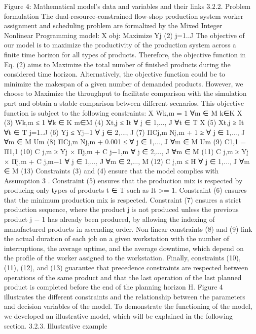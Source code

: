 Figure 4: Mathematical model’s data and variables and their links
3.2.2.	Problem formulation
The dual-resource-constrained flow-shop production system worker assignment and scheduling problem are formalized by the Mixed Integer Nonlinear Programming model:
X
	obj: Maximize	Yj	(2)
j=1..J
The objective of our model is to maximize the productivity of the production system across a finite time horizon for all types of products. Therefore, the objective function in Eq. (2) aims to Maximize the total number of finished products during the considered time horizon. Alternatively, the objective function could be to minimize the makespan of a given number of demanded products. However, we choose to Maximize the throughput to facilitate comparison with the simulation part and obtain a stable comparison between different scenarios.
This objective function is subject to the following constraints:
X	
	Wk,m = 1	∀m ∈ M
k∈K
X	(3)
	Wk,m ≤ 1	∀k ∈ K
m∈M	(4)
	Xt,j ≤ It	∀ j ∈ {1,..., J}	∀t ∈ T
X	(5)
	Xt,j ≥ It	∀t ∈ T
j=1..J	(6)
	Yj ≤ Yj−1	∀ j ∈ {2,..., J}	(7)
ΠCj,m
Nj,m + 1 ≥	 	∀ j ∈ {1,..., J}	∀m ∈ M Um	(8)
ΠCj,m
Nj,m + 0.001 ≤	 	∀ j ∈ {1,..., J}	∀m ∈ M Um	(9)
C1,1 = Π1,1	(10)
C j,m ≥ Yj × Πj,m + C j−1,m	∀ j ∈ {2,..., J}	∀m ∈ M	(11)
	C j,m ≥ Yj × Πj,m + C j,m−1	∀ j ∈ {1,..., J}	∀m ∈ {2,..., M}	(12)
	C j,m ≤ H	∀ j ∈ {1,..., J}	∀m ∈ M	(13)
Constraints (3) and (4) ensure that the model complies with Assumption 3 . Constraint (5) ensures that the production mix is respected by producing only types of products t ∈ T such as It >= 1.
Constraint (6) ensures that the minimum production mix is respected. Constraint (7) ensures a strict production sequence, where the product j is not produced unless the previous product j − 1 has already been produced, by allowing the indexing of manufactured products in ascending order. Non-linear constraints (8) and (9) link the actual duration of each job on a given workstation with the number of interruptions, the average uptime, and the average downtime, which depend on the profile of the worker assigned to the workstation. Finally, constraints (10), (11), (12), and (13) guarantee that precedence constraints are respected between operations of the same product and that the last operation of the last planned product is completed before the end of the planning horizon H.
Figure 4 illustrates the different constraints and the relationship between the parameters and decision variables of the model. To demonstrate the functioning of the model, we developed an illustrative model, which will be explained in the following section.
3.2.3.	Illustrative example
